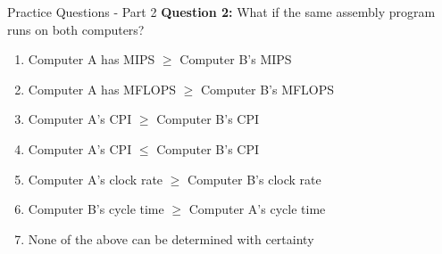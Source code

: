 \documentclass[aspectratio=169,12pt]{beamer}
\begin{document}
\begin{frame}{Practice Questions - Part 2}
\textbf{Question 2:} What if the same assembly program runs on both computers?

\begin{enumerate}
    \item Computer A has MIPS $\geq$ Computer B's MIPS
    \item Computer A has MFLOPS $\geq$ Computer B's MFLOPS
    \item Computer A's CPI $\geq$ Computer B's CPI
    \item Computer A's CPI $\leq$ Computer B's CPI
    \item Computer A's clock rate $\geq$ Computer B's clock rate
    \item Computer B's cycle time $\geq$ Computer A's cycle time
    \item None of the above can be determined with certainty
\end{enumerate}\end{frame}
\end{document}
